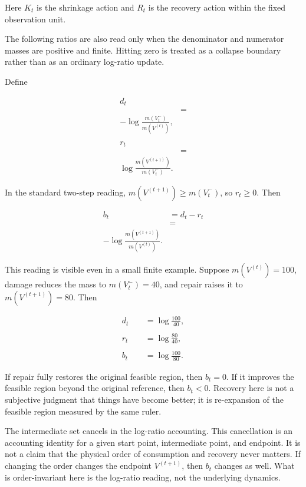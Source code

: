 \documentclass[12pt,a4paper]{article}
\begin{document}
Here \(K_{t}\) is the shrinkage action and \(R_{t}\) is the recovery action within the fixed observation unit.

The following ratios are also read only when the denominator and numerator masses are positive and finite. Hitting zero is treated as a collapse boundary rather than as an ordinary log-ratio update.

Define

\[
\begin{aligned}
d_{t} \\
&= \\
-\log\frac{m(V_{t}^-)}{m(V^{(t)})}, \\
\qquad \\
r_{t} \\
&= \\
\log\frac{m(V^{(t+1)})}{m(V_{t}^-)}.
\end{aligned}
\]

In the standard two-step reading, \(m(V^{(t+1)})\ge m(V_{t}^-)\), so \(r_{t}\ge0\). Then

\[
\begin{aligned}
b_{t}&=d_{t}-r_{t} \\
&= \\
-\log\frac{m(V^{(t+1)})}{m(V^{(t)})}.
\end{aligned}
\]

This reading is visible even in a small finite example. Suppose \(m(V^{(t)})=100\), damage reduces the mass to \(m(V_{t}^-)=40\), and repair raises it to \(m(V^{(t+1)})=80\). Then

\[
\begin{aligned}
d_{t}&=\log\frac{100}{40}, \\
\qquad \\
r_{t}&=\log\frac{80}{40}, \\
\qquad \\
b_{t}&=\log\frac{100}{80}.
\end{aligned}
\]

If repair fully restores the original feasible region, then \(b_{t}=0\). If it improves the feasible region beyond the original reference, then \(b_{t}<0\). Recovery here is not a subjective judgment that things have become better; it is re-expansion of the feasible region measured by the same ruler.

The intermediate set cancels in the log-ratio accounting. This cancellation is an accounting identity for a given start point, intermediate point, and endpoint. It is not a claim that the physical order of consumption and recovery never matters. If changing the order changes the endpoint \(V^{(t+1)}\), then \(b_{t}\) changes as well. What is order-invariant here is the log-ratio reading, not the underlying dynamics.
\end{document}
